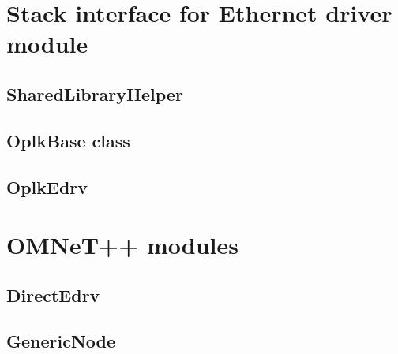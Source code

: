 \section{Stack interface for Ethernet driver module}
\label{app:simulation_stackif}

\subsection{SharedLibraryHelper}
\label{app:simulation_stackif_libhelper}



\subsection{OplkBase class}
\label{app:simulation_stackif_oplkbase}


\subsection{OplkEdrv}
\label{app:simulation_stackif_oplkedrv}



\section{OMNeT++ modules}
\label{app:simulation_sim}

\subsection{DirectEdrv}
\label{app:simulation_sim_edrv}



\subsection{GenericNode}
\label{app:simulation_sim_generic}


